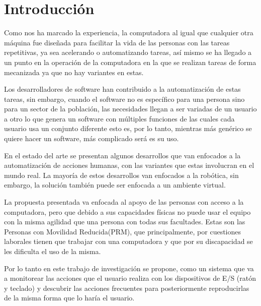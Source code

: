 \chapter{Introducción \label{cap1}}

Como nos ha marcado la experiencia, la computadora al igual que cualquier otra
 máquina fue diseñada para facilitar la vida de las personas con las tareas
 repetitivas, ya sea acelerando o automatizando tareas, así mismo se ha llegado
 a un punto en la operación de la computadora en la que se realizan tareas de
 forma mecanizada ya que no hay variantes en estas.  

Los desarrolladores de software han contribuido a la automatización de estas
 tareas, sin embargo, cuando el software no es específico para una persona
 sino para un sector de la población, las necesidades llegan a ser variadas
 de un usuario a otro lo que genera un software con múltiples funciones de las
 cuales cada usuario usa un conjunto diferente esto es, por lo tanto,
 mientras más genérico se quiere hacer un software, más complicado será es su
 uso. 

En el estado del arte se presentan algunos desarrollos que van enfocados a la
 automatización de acciones humanas, con las variantes que estas involucran en
 el mundo real. La mayoría de estos desarrollos van enfocados a la robótica,
 sin embargo, la solución también puede ser enfocada a un ambiente virtual.  

La propuesta presentada va enfocada al apoyo de las personas con acceso a la
 computadora, pero que debido a sus capacidades físicas no puede usar el equipo
 con la misma agilidad que una persona con todas sus facultades. Estas son las
 Personas con Movilidad Reducida(PRM), que principalmente, por cuestiones
 laborales tienen que trabajar con una computadora y que por su discapacidad se
 les dificulta el uso de la misma.

Por lo tanto en este trabajo de investigación se propone, como un sistema que
 va a monitorear las acciones que el usuario realiza con los dispositivos de
 E/S (ratón y teclado) y  descubrir las acciones frecuentes para posteriormente
 reproducirlas de la misma forma que lo haría el usuario.

